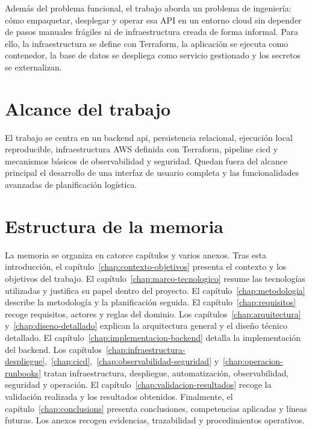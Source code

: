 Además del problema funcional, el trabajo aborda un problema de ingeniería: cómo empaquetar, desplegar y operar esa API en un entorno cloud sin depender de pasos manuales frágiles ni de infraestructura creada de forma informal. Para ello, la infraestructura se define con Terraform, la aplicación se ejecuta como contenedor, la base de datos se despliega como servicio gestionado y los secretos se externalizan.

\section{Alcance del trabajo}
\label{sec:alcance}

El trabajo se centra en un \gls{backend} \acrshort{api}, persistencia relacional, ejecución local reproducible, infraestructura AWS definida con Terraform, pipeline \acrshort{cicd} y mecanismos básicos de observabilidad y seguridad. Quedan fuera del alcance principal el desarrollo de una interfaz de usuario completa y las funcionalidades avanzadas de planificación logística.

\section{Estructura de la memoria}
\label{sec:estructura-memoria}

La memoria se organiza en catorce capítulos y varios anexos. Tras esta introducción, el capítulo~\ref{chap:contexto-objetivos} presenta el contexto y los objetivos del trabajo. El capítulo~\ref{chap:marco-tecnologico} resume las tecnologías utilizadas y justifica su papel dentro del proyecto. El capítulo~\ref{chap:metodologia} describe la metodología y la planificación seguida. El capítulo~\ref{chap:requisitos} recoge requisitos, actores y reglas del dominio. Los capítulos~\ref{chap:arquitectura} y~\ref{chap:diseno-detallado} explican la arquitectura general y el diseño técnico detallado. El capítulo~\ref{chap:implementacion-backend} detalla la implementación del backend. Los capítulos~\ref{chap:infraestructura-despliegue},~\ref{chap:cicd},~\ref{chap:observabilidad-seguridad} y~\ref{chap:operacion-runbooks} tratan infraestructura, despliegue, automatización, observabilidad, seguridad y operación. El capítulo~\ref{chap:validacion-resultados} recoge la validación realizada y los resultados obtenidos. Finalmente, el capítulo~\ref{chap:conclusions} presenta conclusiones, competencias aplicadas y líneas futuras. Los anexos recogen evidencias, trazabilidad y procedimientos operativos.
